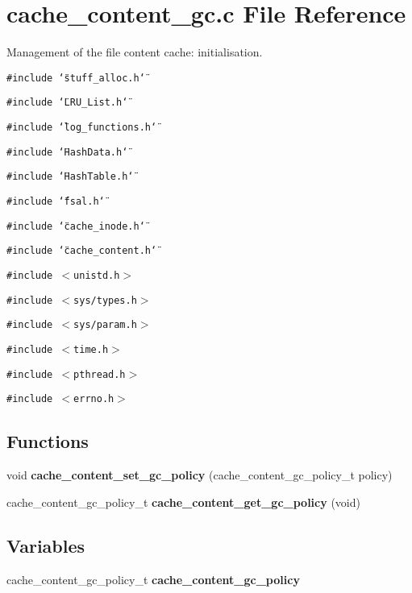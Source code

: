 \section{cache\_\-content\_\-gc.c File Reference}
\label{cache__content__gc_8c}
Management of the file content cache: initialisation.  


{\tt \#include \char`\"{}stuff\_\-alloc.h\char`\"{}}\par
{\tt \#include \char`\"{}LRU\_\-List.h\char`\"{}}\par
{\tt \#include \char`\"{}log\_\-functions.h\char`\"{}}\par
{\tt \#include \char`\"{}HashData.h\char`\"{}}\par
{\tt \#include \char`\"{}HashTable.h\char`\"{}}\par
{\tt \#include \char`\"{}fsal.h\char`\"{}}\par
{\tt \#include \char`\"{}cache\_\-inode.h\char`\"{}}\par
{\tt \#include \char`\"{}cache\_\-content.h\char`\"{}}\par
{\tt \#include $<$unistd.h$>$}\par
{\tt \#include $<$sys/types.h$>$}\par
{\tt \#include $<$sys/param.h$>$}\par
{\tt \#include $<$time.h$>$}\par
{\tt \#include $<$pthread.h$>$}\par
{\tt \#include $<$errno.h$>$}\par
\subsection*{Functions}
\begin{CompactItemize}
\item 
void {\bf cache\_\-content\_\-set\_\-gc\_\-policy} (cache\_\-content\_\-gc\_\-policy\_\-t policy)
\item 
cache\_\-content\_\-gc\_\-policy\_\-t {\bf cache\_\-content\_\-get\_\-gc\_\-policy} (void)
\end{CompactItemize}
\subsection*{Variables}
\begin{CompactItemize}
\item 
cache\_\-content\_\-gc\_\-policy\_\-t {\bf cache\_\-content\_\-gc\_\-policy}
\end{CompactItemize}


